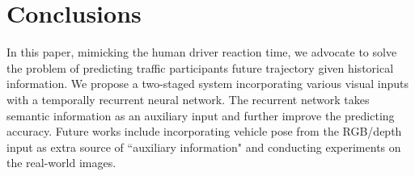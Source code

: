 \documentclass[10pt,twocolumn,letterpaper]{article}
\begin{document}
\section{Conclusions}
In this paper, mimicking the human driver reaction time, we advocate to solve the problem of predicting traffic participants future trajectory given historical information.
We propose a two-staged system incorporating various visual inputs with a temporally recurrent neural network. The recurrent network takes semantic information as an auxiliary input and further improve the predicting accuracy.
Future works include incorporating vehicle pose from the RGB/depth input as extra source of ``auxiliary information" and conducting experiments on the real-world images.




{\small


}
\end{document}

